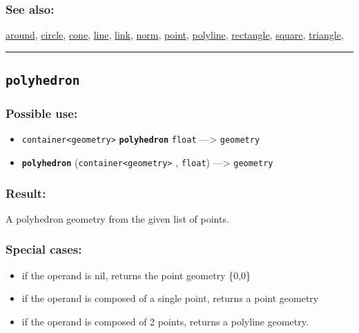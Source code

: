 \documentclass[]{book}
\providecommand{\tightlist}{%
  \setlength{\itemsep}{0pt}\setlength{\parskip}{0pt}}
\theoremstyle{definition}
\theoremstyle{definition}
\theoremstyle{definition}
\theoremstyle{remark}
\begin{document}
\subsubsection{See also:}\label{see-also-166}

\href{OperatorsAA\#around}{around}, \href{OperatorsBC\#circle}{circle},
\href{OperatorsBC\#cone}{cone}, \href{OperatorsIM\#line}{line},
\href{OperatorsIM\#link}{link}, \href{OperatorsNR\#norm}{norm},
\href{OperatorsNR\#point}{point},
\href{OperatorsNR\#polyline}{polyline},
\href{OperatorsNR\#rectangle}{rectangle},
\href{OperatorsSZ\#square}{square},
\href{OperatorsSZ\#triangle}{triangle},

\begin{center}\rule{0.5\linewidth}{\linethickness}\end{center}

\subsection{\texorpdfstring{\texttt{polyhedron}}{polyhedron}}\label{polyhedron}

\subsubsection{Possible use:}\label{possible-use-414}

\begin{itemize}
\tightlist
\item
  \texttt{container\textless{}geometry\textgreater{}}
  \textbf{\texttt{polyhedron}} \texttt{float} ---\textgreater{}
  \texttt{geometry}
\item
  \textbf{\texttt{polyhedron}}
  (\texttt{container\textless{}geometry\textgreater{}} , \texttt{float})
  ---\textgreater{} \texttt{geometry}
\end{itemize}

\subsubsection{Result:}\label{result-400}

A polyhedron geometry from the given list of points.

\subsubsection{Special cases:}\label{special-cases-112}

\begin{itemize}
\tightlist
\item
  if the operand is nil, returns the point geometry \{0,0\}\\
\item
  if the operand is composed of a single point, returns a point
  geometry\\
\item
  if the operand is composed of 2 points, returns a polyline geometry.
\end{itemize}
\end{document}
